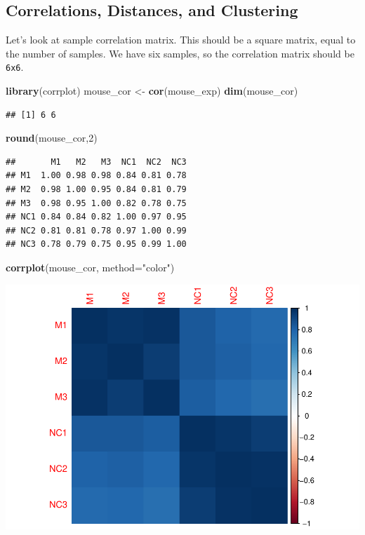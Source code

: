 \documentclass[
]{book}
\newenvironment{Shaded}{\begin{snugshade}}{\end{snugshade}}
\newcommand{\AttributeTok}[1]{\textcolor[rgb]{0.13,0.29,0.53}{#1}}
\newcommand{\DecValTok}[1]{\textcolor[rgb]{0.00,0.00,0.81}{#1}}
\newcommand{\FunctionTok}[1]{\textcolor[rgb]{0.13,0.29,0.53}{\textbf{#1}}}
\newcommand{\NormalTok}[1]{#1}
\newcommand{\OtherTok}[1]{\textcolor[rgb]{0.56,0.35,0.01}{#1}}
\newcommand{\StringTok}[1]{\textcolor[rgb]{0.31,0.60,0.02}{#1}}
\begin{document}
\subsection{Correlations, Distances, and Clustering}\label{correlations-distances-and-clustering}

Let's look at sample correlation matrix. This should be a square matrix, equal to the number of samples.
We have six samples, so the correlation matrix should be \texttt{6x6}.

\begin{Shaded}
\begin{Highlighting}[]
\FunctionTok{library}\NormalTok{(corrplot)}
\NormalTok{mouse\_cor }\OtherTok{\textless{}{-}} \FunctionTok{cor}\NormalTok{(mouse\_exp)}
\FunctionTok{dim}\NormalTok{(mouse\_cor)}
\end{Highlighting}
\end{Shaded}

\begin{verbatim}
## [1] 6 6
\end{verbatim}

\begin{Shaded}
\begin{Highlighting}[]
\FunctionTok{round}\NormalTok{(mouse\_cor,}\DecValTok{2}\NormalTok{)}
\end{Highlighting}
\end{Shaded}

\begin{verbatim}
##       M1   M2   M3  NC1  NC2  NC3
## M1  1.00 0.98 0.98 0.84 0.81 0.78
## M2  0.98 1.00 0.95 0.84 0.81 0.79
## M3  0.98 0.95 1.00 0.82 0.78 0.75
## NC1 0.84 0.84 0.82 1.00 0.97 0.95
## NC2 0.81 0.81 0.78 0.97 1.00 0.99
## NC3 0.78 0.79 0.75 0.95 0.99 1.00
\end{verbatim}

\begin{Shaded}
\begin{Highlighting}[]
\FunctionTok{corrplot}\NormalTok{(mouse\_cor, }\AttributeTok{method=}\StringTok{"color"}\NormalTok{)}
\end{Highlighting}
\end{Shaded}

\includegraphics{_main_files/figure-latex/unnamed-chunk-9-1.pdf}
\end{document}
